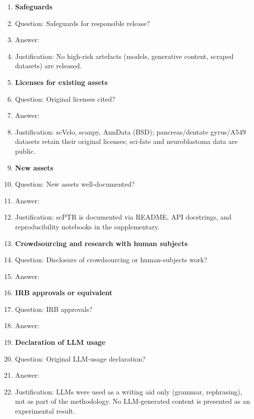 \begin{enumerate}
\item {\bf Safeguards}
  \item[] Question: Safeguards for responsible release?
  \item[] Answer: \answerNA{}
  \item[] Justification: No high-risk artefacts (models, generative content,
  scraped datasets) are released.

\item {\bf Licenses for existing assets}
  \item[] Question: Original licenses cited?
  \item[] Answer: \answerYes{}
  \item[] Justification: scVelo, scanpy, AnnData (BSD); pancreas/dentate
  gyrus/A549 datasets retain their original licenses; sci-fate and
  neuroblastoma data are public.

\item {\bf New assets}
  \item[] Question: New assets well-documented?
  \item[] Answer: \answerYes{}
  \item[] Justification: scPTR is documented via README, API docstrings, and
  reproducibility notebooks in the supplementary.

\item {\bf Crowdsourcing and research with human subjects}
  \item[] Question: Disclosure of crowdsourcing or human-subjects work?
  \item[] Answer: \answerNA{}

\item {\bf IRB approvals or equivalent}
  \item[] Question: IRB approvals?
  \item[] Answer: \answerNA{}

\item {\bf Declaration of LLM usage}
  \item[] Question: Original LLM-usage declaration?
  \item[] Answer: \answerYes{}
  \item[] Justification: LLMs were used as a writing aid only (grammar,
  rephrasing), not as part of the methodology. No LLM-generated content
  is presented as an experimental result.

\end{enumerate}

